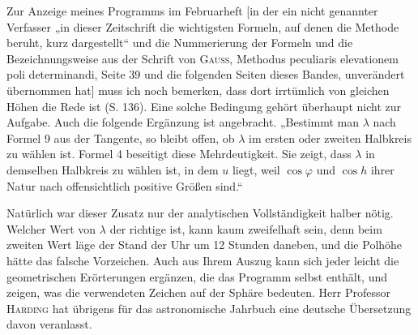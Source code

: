 \par\indent Zur Anzeige meines Programms im Februarheft [in der ein nicht genannter Verfasser „in dieser Zeitschrift die wichtigsten Formeln, auf denen die Methode beruht, kurz dargestellt“ und die Nummerierung der Formeln und die Bezeichnungsweise aus der Schrift von \textsc{Gauss}, Methodus peculiaris elevationem poli determinandi, Seite 39 und die folgenden Seiten dieses Bandes, unverändert übernommen hat] muss ich noch bemerken, dass dort irrtümlich von gleichen Höhen die Rede ist (S. 136). Eine solche Bedingung gehört überhaupt nicht zur Aufgabe. Auch die folgende Ergänzung ist angebracht. „Bestimmt man $\lambda$ nach Formel 9 aus der Tangente, so bleibt offen, ob $\lambda$ im ersten oder zweiten Halbkreis zu wählen ist. Formel 4 beseitigt diese Mehrdeutigkeit. Sie zeigt, dass $\lambda$ in demselben Halbkreis zu wählen ist, in dem $u$ liegt, weil $\cos\varphi$ und $\cos h$ ihrer Natur nach offensichtlich positive Größen sind.“

\par\indent Natürlich war dieser Zusatz nur der analytischen Vollständigkeit halber nötig. Welcher Wert von $\lambda$ der richtige ist, kann kaum zweifelhaft sein, denn beim zweiten Wert läge der Stand der Uhr um 12 Stunden daneben, und die Polhöhe hätte das falsche Vorzeichen. Auch aus Ihrem Auszug kann sich jeder leicht die geometrischen Erörterungen ergänzen, die das Programm selbst enthält, und zeigen, was die verwendeten Zeichen auf der Sphäre bedeuten. Herr Professor \textsc{Harding} hat übrigens für das astronomische Jahrbuch eine deutsche Übersetzung davon veranlasst.
